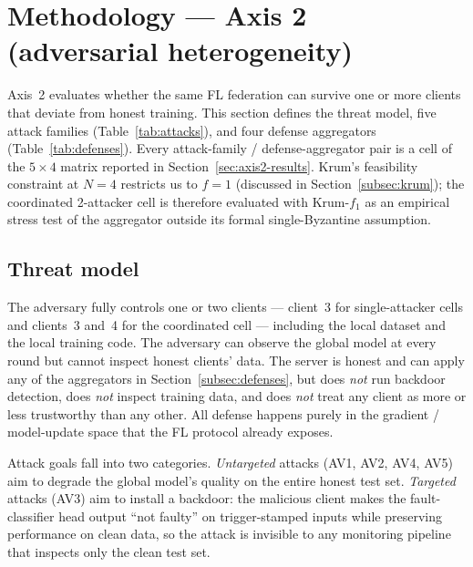 \documentclass[a4paper,fleqn,doubleblind]{cas-sc}
\begin{document}

\section{Methodology --- Axis 2 (adversarial heterogeneity)}
\label{sec:axis2-method}

Axis~2 evaluates whether the same FL federation can survive one or
more clients that deviate from honest training. This section
defines the threat model, five attack families (Table~\ref{tab:attacks}),
and four defense aggregators (Table~\ref{tab:defenses}). Every
attack-family / defense-aggregator pair is a cell of the
$5 \times 4$ matrix reported in Section~\ref{sec:axis2-results}.
Krum's feasibility constraint at $N = 4$ restricts us to $f = 1$
(discussed in Section~\ref{subsec:krum}); the coordinated 2-attacker
cell is therefore evaluated with Krum-$f_1$ as an empirical stress
test of the aggregator outside its formal single-Byzantine
assumption.

\subsection{Threat model}
\label{subsec:threat-model}

The adversary fully controls one or two clients --- client~3 for
single-attacker cells and clients~3 and~4 for the coordinated cell
--- including the local dataset and the local training code. The
adversary can observe the global model at every round but cannot
inspect honest clients' data. The server is honest and can apply
any of the aggregators in Section~\ref{subsec:defenses}, but does
\emph{not} run backdoor detection, does \emph{not} inspect training
data, and does \emph{not} treat any client as more or less
trustworthy than any other. All defense happens purely in the
gradient / model-update space that the FL protocol already exposes.

Attack goals fall into two categories. \emph{Untargeted} attacks
(AV1, AV2, AV4, AV5) aim to degrade the global model's quality on
the entire honest test set. \emph{Targeted} attacks (AV3) aim to
install a backdoor: the malicious client makes the fault-classifier
head output ``not faulty'' on trigger-stamped inputs while
preserving performance on clean data, so the attack is invisible to
any monitoring pipeline that inspects only the clean test set.
\end{document}
